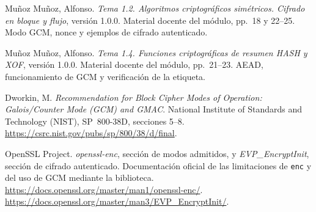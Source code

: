 \begin{enumerate}[label={[\arabic*]}]
  \item\label{ref:tema-gcm} Muñoz Muñoz, Alfonso. \textit{Tema 1.2. Algoritmos criptográficos simétricos. Cifrado en bloque y flujo}, versión 1.0.0. Material docente del módulo, pp.~18 y 22--25. Modo GCM, nonce y ejemplos de cifrado autenticado.
  \item\label{ref:tema-aead} Muñoz Muñoz, Alfonso. \textit{Tema 1.4. Funciones criptográficas de resumen HASH y XOF}, versión 1.0.0. Material docente del módulo, pp.~21--23. AEAD, funcionamiento de GCM y verificación de la etiqueta.
  \item\label{ref:nist-gcm} Dworkin, M. \textit{Recommendation for Block Cipher Modes of Operation: Galois/Counter Mode (GCM) and GMAC}. National Institute of Standards and Technology (NIST), SP~800-38D, secciones 5--8. \url{https://csrc.nist.gov/pubs/sp/800/38/d/final}.
  \item\label{ref:openssl-gcm} OpenSSL Project. \textit{openssl-enc}, sección de modos admitidos, y \textit{EVP\_EncryptInit}, sección de cifrado autenticado. Documentación oficial de las limitaciones de \texttt{enc} y del uso de GCM mediante la biblioteca. \url{https://docs.openssl.org/master/man1/openssl-enc/}. \url{https://docs.openssl.org/master/man3/EVP_EncryptInit/}.
\end{enumerate}

